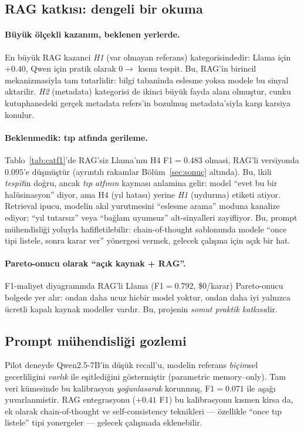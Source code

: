 \documentclass[11pt,a4paper]{article}
\begin{document}
\subsection{RAG katkısı: dengeli bir okuma}
\paragraph{Büyük ölçekli kazanım, beklenen yerlerde.} En büyük RAG kazanci
\emph{H1} (var olmayan referans) kategorisindedir: Llama için $+0.40$,
Qwen için pratik olarak $0 \to$ kısmı tespit. Bu, RAG'in birincil
mekanizmasiyla tam tutarlidir: bilgi tabaninda eslesme yoksa modele bu
sinyal aktarilir. \emph{H2} (metadata) kategorisi de ikinci büyük fayda
alanı olmuştur, cunku kutuphanedeki gerçek metadata refers'in bozulmuş
metadata'siyla karşı karsiya konulur.

\paragraph{Beklenmedik: tıp atfında gerileme.} Tablo~\ref{tab:catf1}'de
RAG'siz Llama'nın H4 F1$=0.483$ olmasi, RAG'li versiyonda $0.095$'e
düşmüştür (ayrıntılı rakamlar Bölüm~\ref{sec:sonuç} altında). Bu, i̇kili
\emph{tespit}in doğru, ancak \emph{tıp atfının} kayması anlamina gelir:
model ``evet bu bir halüsinasyon'' diyor, ama H4 (yıl hatası) yerine
\emph{H1} (uydurma) etiketi atiyor. Retrieval ipucu, modelin akıl yurutmesini
``eslesme arama'' moduna kanalize ediyor; ``yıl tutarsız'' veya ``bağlam
uyumsuz'' alt-sinyalleri zayifliyor. Bu, prompt mühendisliği yoluyla
hafifletilebilir: chain-of-thought \cite{wei2022cot} sablonunda modele
``once tipi listele, sonra karar ver'' yönergesi vermek, gelecek çalışma
için açık bir hat.

\paragraph{Pareto-onucu olarak ``açık kaynak + RAG''.} F1-maliyet
diyagramında RAG'li Llama (F1$=0.792$, \$0/karar) Pareto-onucu bolgede
yer alır: ondan daha ucuz hicbir model yoktur, ondan daha iyi yalnızca
ücretli kapalı kaynak modeller vardır. Bu, projenin \emph{somut praktik
katkısı}dir.

\subsection{Prompt mühendisliği gozlemi}
Pilot deneyde Qwen2.5-7B'in düşük recall'u, modelin referans
\emph{biçim}sel gecerliligini \emph{varlık} ile eşitlediğini göstermiştir
(parametric memory--only). Tam veri kümesinde bu kalibrasyon \emph{yo\u
gunlasarak} korunmuş, F1$=0.071$ ile aşağı yuvarlanmistir. RAG entegrasyonu
($+0.41$ F1) bu kalibrasyonu kısmen kirsa da, ek olarak chain-of-thought
\cite{wei2022cot} ve self-consistency \cite{wang2023selfconsistency}
teknikleri --- özellikle ``once tıp listele'' tipi yonergeler --- gelecek
çalışmada eklenebilir.
\end{document}

